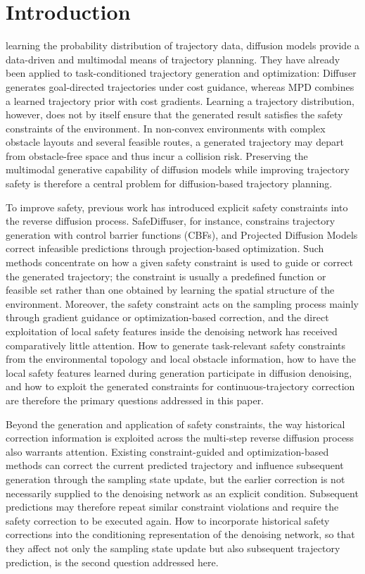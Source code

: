 \documentclass[journal]{IEEEtran}
\begin{document}
\section{Introduction}
 learning the probability distribution of trajectory data,
diffusion models provide a data-driven and multimodal means of trajectory
planning. They have already been applied to task-conditioned trajectory
generation and optimization: Diffuser generates goal-directed trajectories
under cost guidance, whereas MPD combines a learned trajectory prior with cost
gradients. Learning a trajectory distribution, however, does not by itself
ensure that the generated result satisfies the safety constraints of the
environment. In non-convex environments with complex obstacle layouts and
several feasible routes, a generated trajectory may depart from obstacle-free
space and thus incur a collision risk. Preserving the multimodal generative
capability of diffusion models while improving trajectory safety is therefore
a central problem for diffusion-based trajectory planning.

To improve safety, previous work has introduced explicit safety constraints
into the reverse diffusion process. SafeDiffuser, for instance, constrains
trajectory generation with control barrier functions (CBFs), and Projected
Diffusion Models correct infeasible predictions through projection-based
optimization. Such methods concentrate on how a given safety constraint is
used to guide or correct the generated trajectory; the constraint is usually a
predefined function or feasible set rather than one obtained by learning the
spatial structure of the environment. Moreover, the safety constraint acts on
the sampling process mainly through gradient guidance or optimization-based
correction, and the direct exploitation of local safety features inside the
denoising network has received comparatively little attention. How to generate
task-relevant safety constraints from the environmental topology and local
obstacle information, how to have the local safety features learned during
generation participate in diffusion denoising, and how to exploit the generated
constraints for continuous-trajectory correction are therefore the primary
questions addressed in this paper.

Beyond the generation and application of safety constraints, the way
historical correction information is exploited across the multi-step reverse
diffusion process also warrants attention. Existing constraint-guided and
optimization-based methods can correct the current predicted trajectory and
influence subsequent generation through the sampling state update, but the
earlier correction is not necessarily supplied to the denoising network as an
explicit condition. Subsequent predictions may therefore repeat similar
constraint violations and require the safety correction to be executed again.
How to incorporate historical safety corrections into the conditioning
representation of the denoising network, so that they affect not only the
sampling state update but also subsequent trajectory prediction, is the second
question addressed here.
\end{document}
